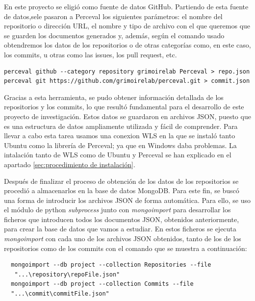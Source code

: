 \documentclass[a4paper, 12pt]{book}
\begin{document}
En este proyecto se eligió como fuente de datos GitHub. 
Partiendo de esta fuente de datos,sele pasaron a Perceval los siguientes parámetros: el nombre del repositorio o dirección URL, el nombre y tipo de archivo con el que queremos que se guarden los documentos generados y, además, según el comando usado obtendremos los datos de los repositorios o de otras categorías como, en este caso, los commits, u otras como las issues, los pull request, etc.
\begin{verbatim}
perceval github --category repository grimoirelab Perceval > repo.json
perceval git https://github.com/grimoirelab/perceval.git > commit.json
\end{verbatim} 
    

Gracias a esta herramienta, se pudo obtener información detallada de los repositorios y los commits, lo que resultó fundamental para el desarrollo de este proyecto de investigación.
Estos datos se guardaron en archivos JSON, puesto que es una estructura de datos ampliamente utilizada y fácil de comprender.
Para llevar a cabo esta tarea usamos una conexion WLS en la que se instaló tanto Ubuntu como la librería de Perceval; ya que en Windows daba problemas.
La intalación tanto de WLS como de Ubuntu y Perceval se han explicado en el apartado \ref{sec:procedimiento de instalación}.

Después de finalizar el proceso de obtención de los datos de los repositorios se procedió a almacenarlos en la base de datos MongoDB.
Para este fin, se buscó una forma de introducir los archivos JSON de forma automática. 
Para ello, se uso el módulo de python \emph{subprocess} junto con \emph{mongoimport} para desarrollar los ficheros que introducen todos los documentos JSON, obtenidos anteriormente, para crear la base de datos que vamos a estudiar.
En estos ficheros se ejecuta \emph{mongoimport} con cada uno de los archivos JSON obtenidos, tanto de los de los repositorios como de los commits con el comando que se muestra a continuación:
\begin{verbatim}
  mongoimport --db project --collection Repositories --file
   "...\repository\repoFile.json"
  mongoimport --db project --collection Commits --file 
  "...\commit\commitFile.json"
\end{verbatim}
\end{document}
